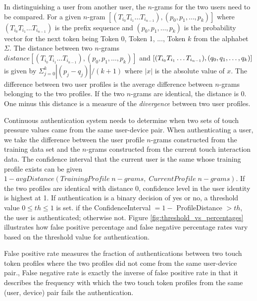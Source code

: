 \documentclass{acm_proc_article-sp}
\begin{document}
In distinguishing a user from another user, the $n$-grams for the two users need to be compared. 
For a given $n$-gram $[(T_{i_0} T_{i_1} \dots T_{i_{n-1}}), (p_0, p_1, \dots, p_k)]$ where 
$(T_{i_0} T_{i_1} \dots T_{i_{n-1}})$ is the prefix sequence and $(p_0, p_1, \dots, p_k)$ is the
probability vector for the next token being Token 0, Token 1, ..., Token $k$ from the alphabet $\Sigma$.
The distance between two $n$-grams $distance[(T_{i_0} T_{i_1} \dots T_{i_{n-1}}), (p_0, p_1, \dots, p_k)]$
and $[(T_{i_0} T_{i_1} \dots T_{i_{n-1}}), \\(q_0, q_1, \dots, q_k)]$ is
given by $\Sigma_{j=0}^k|(p_j - q_j)|/(k+1)$ where $|x|$ is the absolute value of $x$.
The difference between two user profiles is the average difference between $n$-grams belonging
to the two profiles. If the two $n$-grams are identical, the distance is 0.
One minus this distance is a measure of the {\it divergence} between two user profiles.

Continuous authentication system needs to determine when two sets of touch pressure values came from the same user-device pair. When authenticating a user, we take the difference between
the user profile $n$-grams constructed from the training data set and the $n$-grams
constructed from the current touch interaction data. The confidence interval
that the current user is the same whose training profile exists can be given $1 - 
avgDistance(TrainingProfile \; n-grams, \; CurrentProfile \; n-grams)$. If the two profiles are
identical with distance 0, confidence level in the user identity is highest at 1.
%
If authentication is a binary decision of yes or no, a threshold value $0 \leq th \leq 1$ is set.
if the ConfidenceInterval $= 1 -$ ProfileDistance $> th$, the user is authenticated; otherwise not. 
Figure \ref{fig:threshold_vs_percentages} illustrates how false positive percentage and false negative percentage rates vary based on the threshold value for authentication. 


False positive rate measures the fraction of authentications between two touch token profiles where 
the two profiles did not come from the same user-device pair.,
False negative rate is exactly the inverse of false positive rate in that it describes the
frequency with which the two touch token profiles from the same (user, device) pair fails the authentication. 
\end{document}
